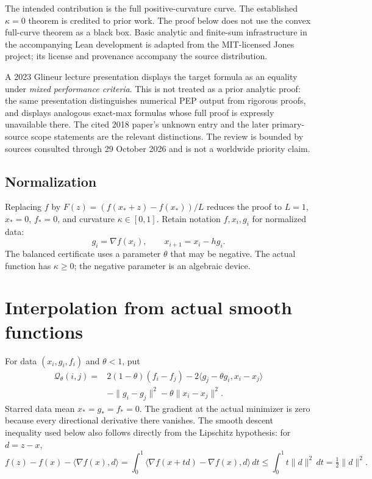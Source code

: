 \documentclass[11pt]{article}
\numberwithin{equation}{section}
\theoremstyle{remark}
\newcommand{\ip}[2]{\langle #1,#2\rangle}
\newcommand{\norm}[1]{\lVert #1\rVert}
\newcommand{\grad}{\nabla}
\newcommand{\Q}{\mathcal Q}
\begin{document}
The intended contribution is the full positive-curvature curve.
The established $\kappa=0$ theorem is credited to prior work. The proof below does not use
the convex full-curve theorem as a black box. Basic analytic and
finite-sum infrastructure in the accompanying Lean development is
adapted from the MIT-licensed Jones project; its license and provenance
accompany the source distribution.

A 2023 Glineur lecture presentation \cite{Glineur23} displays the target formula as an
equality under \emph{mixed performance criteria}. This is not treated as
a prior analytic proof: the same presentation distinguishes numerical
PEP output from rigorous proofs, and displays analogous exact-max
formulas whose full proof is expressly unavailable there. The cited
2018 paper's unknown entry and the later primary-source scope statements
are the relevant distinctions. The review is bounded by sources consulted
through 29 October 2026 and is not a worldwide priority claim.

\subsection{Normalization}

Replacing $f$ by $F(z)=(f(x_*+z)-f(x_*))/L$ reduces the proof to
$L=1$, $x_*=0$, $f_*=0$, and curvature $\kappa\in[0,1]$.
Retain notation $f,x_i,g_i$ for normalized data:
\begin{equation}
g_i=\grad f(x_i),\qquad x_{i+1}=x_i-hg_i.
\label{eq:normalized-gd}
\end{equation}
The balanced certificate uses a parameter $\theta$ that may be negative.
The actual function has $\kappa\geq0$; the negative parameter is an
algebraic device.

\section{Interpolation from actual smooth functions}

For data $(x_i,g_i,f_i)$ and $\theta<1$, put
\begin{equation}
\begin{split}
\Q_\theta(i,j)={}&2(1-\theta)(f_i-f_j)
 -2\ip{g_j-\theta g_i}{x_i-x_j}\\
&-\norm{g_i-g_j}^2-\theta\norm{x_i-x_j}^2.
\end{split}
\label{eq:Q}
\end{equation}
Starred data mean $x_*=g_*=f_*=0$.
The gradient at the actual minimizer is zero because every directional
derivative there vanishes. The smooth descent inequality used below
also follows directly from the Lipschitz hypothesis: for $d=z-x$,
\[
f(z)-f(x)-\ip{\grad f(x)}d
=\int_0^1\ip{\grad f(x+td)-\grad f(x)}d\,dt
\leq\int_0^1t\norm d^2\,dt=\tfrac12\norm d^2.
\]
\end{document}
